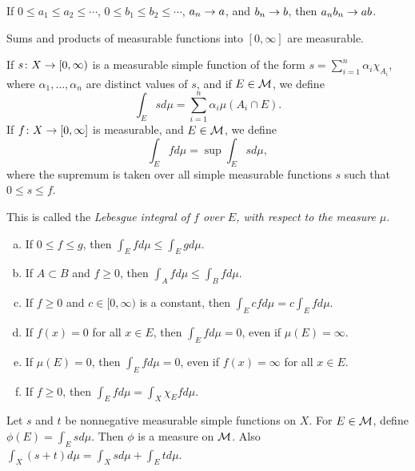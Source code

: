 \begin{proposition}
  If $0 \leq a_1 \leq a_2 \leq \cdots$, $0 \leq b_1 \leq b_2 \leq \cdots$, $a_n \rightarrow a$, and $b_n \rightarrow b$, then $a_n b_n \rightarrow a b$.
\end{proposition}

\begin{corollary}
  Sums and products of measurable functions into $[0,\infty]$ are measurable.
\end{corollary}

\begin{definition}
  If $s \colon X \rightarrow [0,\infty)$ is a measurable simple function of the form $s = \sum_{i=1}^n \alpha_i \chi_{A_i}$, where $\alpha_1, \dots, \alpha_n$ are distinct values of $s$, and if $E \in \mathcal{M}$, we define
  \[
  \int_E s d\mu = \sum_{i=1}^n \alpha_i \mu(A_i \cap E).
  \]
  If $f \colon X \rightarrow [0, \infty]$ is measurable, and $E \in \mathcal{M}$, we define
  \[
  \int_E f d\mu = \sup \int_E s d\mu,
  \]
  where the supremum is taken over all simple measurable functions $s$ such that $0 \leq s \leq f$.
\end{definition}
This is called the \emph{Lebesgue integral of $f$ over $E$, with respect to the measure $\mu$}.

\begin{proposition}
  \mbox{}
  \begin{enumerate}[(a)]
  \item If $0 \leq f \leq g$, then $\int_E f d\mu \leq \int_E g d\mu$.
  \item If $A \subset B$ and $f \geq 0$, then $\int_A f d\mu \leq \int_B f d\mu$.
  \item If $f \geq 0$ and $c \in [0,\infty)$ is a constant, then $\int_E c f d\mu = c \int_E f d\mu$.
  \item If $f(x) = 0$ for all $x \in E$, then $\int_E f d\mu = 0$, even if $\mu(E) = \infty$.
  \item If $\mu(E) = 0$, then $\int_E f d\mu = 0$, even if $f(x) = \infty$ for all $x \in E$.
  \item If $f \geq 0$, then $\int_E f d\mu = \int_X \chi_E f d\mu$.
  \end{enumerate}
\end{proposition}

\begin{proposition}
  Let $s$ and $t$ be nonnegative measurable simple functions on $X$. For $E \in \mathcal{M}$, define $\phi(E) = \int_E s d\mu$. Then $\phi$ is a measure on $\mathcal{M}$. Also $\int_X (s+t) d\mu = \int_X s d\mu + \int_E t d\mu$.
\end{proposition}

